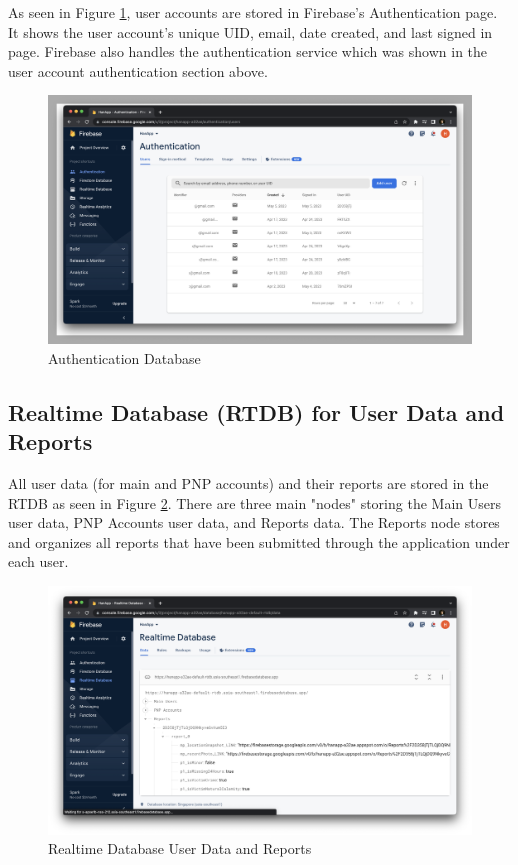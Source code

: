 As seen in Figure \ref{fig:firebaseAuth}, user accounts are stored in Firebase's Authentication page. It shows the user account's unique UID, email, date created, and last signed in page. Firebase also handles the authentication service which was shown in the user account authentication section above.
\begin{figure}[!h]
    \centering
    \begin{minipage}[c]{1\linewidth}
        \centering
        \includegraphics[scale=0.25]{figures/Chapter4/Firebase/authentication.png}
        \caption{Authentication Database}
        \label{fig:firebaseAuth}
    \end{minipage}
\end{figure}
\subsection{Realtime Database (RTDB) for User Data and Reports}

All user data (for main and PNP accounts) and their reports are stored in the RTDB as seen in Figure \ref{fig:firebaseRTDB}. There are three main "nodes" storing the Main Users user data, PNP Accounts user data, and Reports data. The Reports node stores and organizes all reports that have been submitted through the application under each user.
\begin{figure}[!h]
    \centering
    \begin{minipage}[c]{1\linewidth}
        \centering
        \includegraphics[scale=0.25]{figures/Chapter4/Firebase/rtdbReports.png}
        \caption{Realtime Database User Data and Reports}
        \label{fig:firebaseRTDB}
    \end{minipage}
\end{figure}
